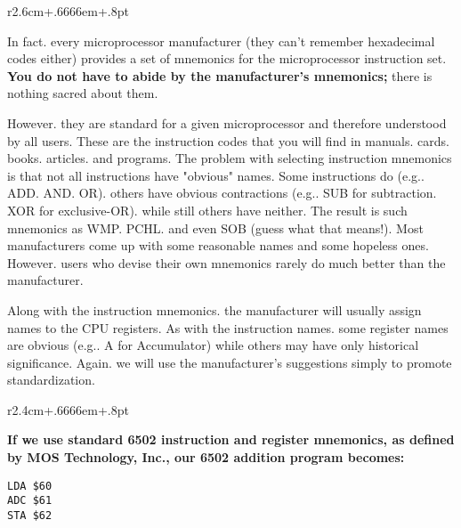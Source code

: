 \documentclass{book}
\begin{document}
\begin{wrapfigure}{r}{2.6cm+.6666em+.8pt}
\end{wrapfigure}
In fact. every microprocessor manufacturer (they can't remember hexadecimal codes either) provides a set of mnemonics for the microprocessor instruction set. \textbf{You do not have to abide by the manufacturer's mnemonics;} there is nothing sacred about them.

However. they are standard for a given microprocessor and therefore understood by all users. These are the instruction codes that you will find in manuals. cards. books. articles. and programs. The problem with selecting instruction mnemonics is that not all instructions have "obvious" names. Some instructions do (e.g.. ADD. AND. OR). others have obvious contractions (e.g.. SUB for subtraction. XOR for exclusive-OR). while still others have neither. The result is such mnemonics as WMP. PCHL. and even SOB (guess what that means!). Most manufacturers come up with some reasonable names and some hopeless ones. However. users who devise their own mnemonics rarely do much better than the manufacturer.

Along with the instruction mnemonics. the manufacturer will usually assign names to the CPU registers. As with the instruction names. some register names are obvious (e.g.. A for Accumulator) while others may have only historical significance. Again. we will use the manufacturer's suggestions simply to promote standardization.\\

\begin{wrapfigure}{r}{2.4cm+.6666em+.8pt}
\end{wrapfigure}
\textbf{If we use standard 6502 instruction and register mnemonics, as defined by MOS Technology, Inc., our 6502 addition program becomes:}
\begin{verbatim}
LDA $60
ADC $61
STA $62
\end{verbatim}
\end{document}
